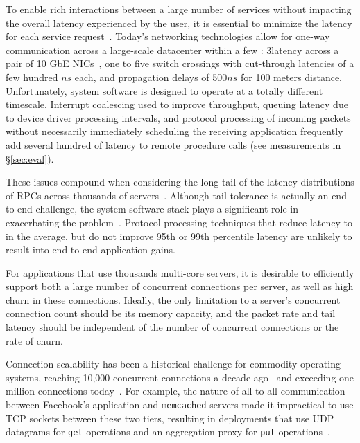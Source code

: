  To enable rich interactions
between a large number of services %
without impacting the overall latency experienced by the user, it is essential
to minimize the latency for each service
request~\cite{luiz-isscc,rumble2011s}. Today's networking technologies
allow for one-way communication across a large-scale datacenter within
a few \microsecond: 3\microsecond latency across a pair of 10 GbE
NICs~\cite{cisco-sereno}, one to five switch crossings with
cut-through latencies of a few hundred $ns$ each, and propagation
delays of 500$ns$ for 100 meters distance. Unfortunately, system
software is designed to operate at a totally different
timescale. Interrupt coalescing used to improve throughput, queuing
latency due to device driver processing intervals, and protocol
processing of incoming packets without necessarily immediately
scheduling the receiving application frequently add several hundred
\microsecond of latency to remote procedure calls (see measurements in
\S\ref{sec:eval}).


These issues compound when considering the long tail of the latency
distributions of RPCs across thousands of
servers~\cite{DBLP:journals/cacm/DeanB13}. Although tail-tolerance is
actually an end-to-end challenge, the system software stack plays a
significant role in exacerbating the problem~\cite{Leverich:RHSU:2014}.
Protocol-processing techniques that reduce latency to \microsecond in
the average, but do not improve 95th or 99th percentile latency are
unlikely to result into end-to-end application gains.

 For applications that use thousands
multi-core servers, it is desirable to efficiently support both a
large number of concurrent connections per server, as well as high
churn in these connections.  Ideally, the only limitation to a
server's concurrent connection count should be its memory capacity, and
the packet rate and tail latency should be independent of the number
of concurrent connections or the rate of churn.
 
Connection scalability has been a historical challenge for commodity
operating systems, reaching 10,000 concurrent connections a decade
ago~\cite{theC10Kproblem} and exceeding one million connections
today~\cite{theC10Mproblem}.  For example, the nature of all-to-all
communication between Facebook's application and \texttt{memcached}
servers made it impractical to use TCP sockets between these two
tiers, resulting in deployments that use UDP datagrams for
\texttt{get} operations and an aggregation proxy for \texttt{put}
operations~\cite{nishtala2013scaling}.

